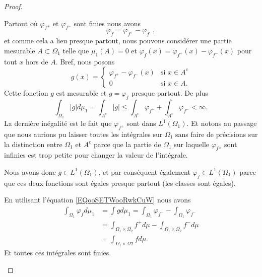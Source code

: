 \begin{proof}
\begin{subproof}
		Partout où \( \varphi_{f^+}\) et \( \varphi_{f^-}\) sont finies nous avons
		\begin{equation}
			\varphi_f=\varphi_{f^+}-\varphi_{f^-},
		\end{equation}
		et comme cela a lieu presque partout, nous pouvons considérer une partie mesurable \( A\subset \Omega_1\) telle que \( \mu_1(A)=0\) et \( \varphi_f(x)=\varphi_{f^+}(x)-\varphi_{f^-}(x)\) pour tout \( x\) hors de \( A\). Bref, nous posons
		\begin{equation}
			g(x)=\begin{cases}
				\varphi_{f^+}-\varphi_{f^-}(x) & \text{si } x\in A^c \\
				0                              & \text{si } x\in A.
			\end{cases}
		\end{equation}
		Cette fonction \( g\) est mesurable et \( g=\varphi_f\) presque partout. De plus
		\begin{equation}
			\int_{\Omega_1}| g |d\mu_1   = \int_{A^c}| g |\leq \int_{A^c}\varphi_{f^+}+\int_{A^c}\varphi_{f^-}<\infty.
		\end{equation}
		La dernière inégalité est le fait que \( \varphi_{f^{\pm}}\) sont dans \( L^1(\Omega_1)\). Et notons au passage que nous aurions pu laisser toutes les intégrales sur \( \Omega_1\) sans faire de précisions sur la distinction entre \( \Omega_1\) et \( A^c\) parce que la partie de \( \Omega_1\) sur laquelle \( \varphi_{f^{\pm}}\) sont infinies est trop petite pour changer la valeur de l'intégrale.

		Nous avons donc \( g\in L^1(\Omega_1)\), et par conséquent également \( \varphi_f\in L^1(\Omega_1)\) parce que ces deux fonctions sont égales presque partout (les classes sont égales).


		En utilisant l'équation \eqref{EQooSETWooRwkCuW} nous avons
		\begin{subequations}
			\begin{align}
				\int_{\Omega_1}\varphi_fd\mu_1 & =\int gd\mu_1=\int_{\Omega_1}\varphi_{f^+}-\int_{\Omega_1}\varphi_{f^-}      \\
				                               & =\int_{\Omega_1\times\Omega_2 }f^+d\mu-\int_{\Omega_1\times \Omega_2}f^-d\mu \\
				                               & =\int_{\Omega_1\times \Omega2}fd\mu.
			\end{align}
		\end{subequations}
		Et toutes ces intégrales sont finies.
	\end{subproof}


\end{proof}
